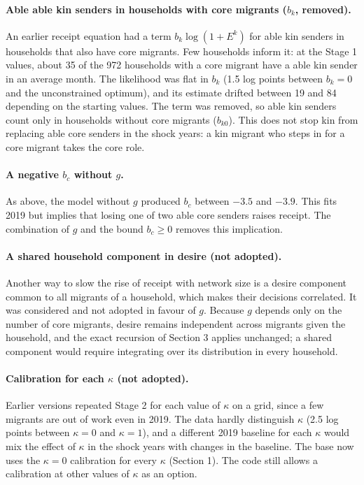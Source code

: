 \documentclass[11pt]{article}
\begin{document}
\paragraph{Able able kin senders in households with core migrants ($b_k$, removed).} An earlier receipt equation had a term $b_k \log(1 + E^k)$ for able kin senders in households that also have core migrants. Few households inform it: at the Stage 1 values, about 35 of the 972 households with a core migrant have a able kin sender in an average month. The likelihood was flat in $b_k$ (1.5 log points between $b_k = 0$ and the unconstrained optimum), and its estimate drifted between 19 and 84 depending on the starting values. The term was removed, so able kin senders count only in households without core migrants ($b_{k0}$). This does not stop kin from replacing able core senders in the shock years: a kin migrant who steps in for a core migrant takes the core role.

\paragraph{A negative $b_c$ without $g$.} As above, the model without $g$ produced $b_c$ between $-3.5$ and $-3.9$. This fits 2019 but implies that losing one of two able core senders raises receipt. The combination of $g$ and the bound $b_c \ge 0$ removes this implication.

\paragraph{A shared household component in desire (not adopted).} Another way to slow the rise of receipt with network size is a desire component common to all migrants of a household, which makes their decisions correlated. It was considered and not adopted in favour of $g$. Because $g$ depends only on the number of core migrants, desire remains independent across migrants given the household, and the exact recursion of Section 3 applies unchanged; a shared component would require integrating over its distribution in every household.

\paragraph{Calibration for each $\kappa$ (not adopted).} Earlier versions repeated Stage 2 for each value of $\kappa$ on a grid, since a few migrants are out of work even in 2019. The data hardly distinguish $\kappa$ (2.5 log points between $\kappa = 0$ and $\kappa = 1$), and a different 2019 baseline for each $\kappa$ would mix the effect of $\kappa$ in the shock years with changes in the baseline. The base now uses the $\kappa = 0$ calibration for every $\kappa$ (Section 1). The code still allows a calibration at other values of $\kappa$ as an option.
\end{document}
